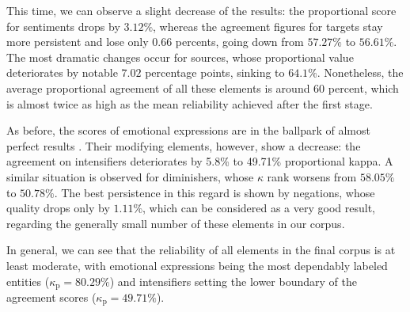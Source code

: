 This time, we can observe a slight decrease of the results: the
proportional score for sentiments drops by $3.12\%$, whereas the
agreement figures for targets stay more persistent and lose only 0.66
percents, going down from $57.27\%$ to $56.61\%$.  The most dramatic
changes occur for sources, whose proportional value deteriorates by
notable $7.02$ percentage points, sinking to $64.1\%$.  Nonetheless,
the average proportional agreement of all these elements is around 60
percent, which is almost twice as high as the mean reliability
achieved after the first stage.

As before, the scores of emotional expressions are in the ballpark of
almost perfect results \cite[cf.][]{Landis:77}.  Their modifying
elements, however, show a decrease: the agreement on intensifiers
deteriorates by 5.8\% to 49.71\% proportional kappa.  A similar
situation is observed for diminishers, whose $\kappa$ rank worsens
from $58.05\%$ to $50.78\%$.  The best persistence in this regard is
shown by negations, whose quality drops only by $1.11\%$, which can be
considered as a very good result, regarding the generally small number
of these elements in our corpus.

In general, we can see that the reliability of all elements in the
final corpus is at least moderate, with emotional expressions being
the most dependably labeled entities ($\kappa_{\textrm{p}}=80.29\%$)
and intensifiers setting the lower boundary of the agreement scores
($\kappa_{\textrm{p}}=49.71\%$).

